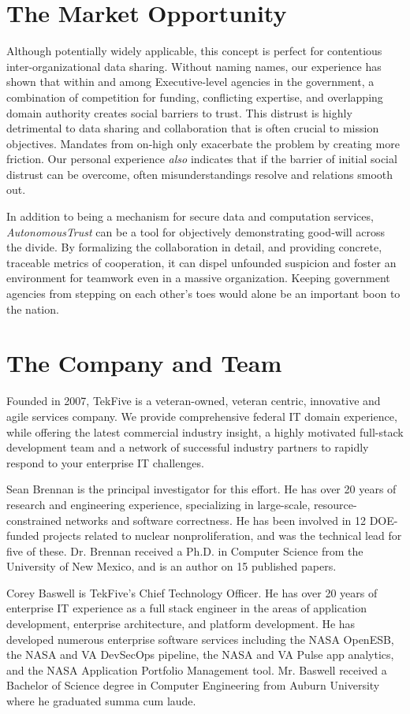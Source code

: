 \documentclass[10pt, twoside]{article}
\newcommand{\projectName}{\emph{AutonomousTrust }}
\begin{document}
\section{The Market Opportunity}

Although potentially widely applicable, this concept is perfect for contentious inter-organizational data sharing. Without naming names, our experience has shown that within and among Executive-level agencies in the government, a combination of competition for funding, conflicting expertise, and overlapping domain authority creates social barriers to trust. This distrust is highly detrimental to data sharing and collaboration that is often crucial to mission objectives. Mandates from on-high only exacerbate the problem by creating more friction. Our personal experience \emph{also} indicates that if the barrier of initial social distrust can be overcome, often misunderstandings resolve and relations smooth out.

In addition to being a mechanism for secure data and computation services, \projectName can be a tool for objectively demonstrating good-will across the divide. By formalizing the collaboration in detail, and providing concrete, traceable metrics of cooperation, it can dispel unfounded suspicion and foster an environment for teamwork even in a massive organization. Keeping government agencies from stepping on each other's toes would alone be an important boon to the nation.

\section{The Company and Team}

Founded in 2007, TekFive is a veteran-owned, veteran centric, innovative and agile services company. We provide comprehensive federal IT domain experience, while offering the latest commercial industry insight, a highly motivated full-stack development team and a network of successful industry partners to rapidly respond to your enterprise IT challenges.

Sean Brennan is the principal investigator for this effort. He has over 20 years of research and engineering experience, specializing in large-scale, resource-constrained networks and software correctness. He has been involved in 12 DOE-funded projects related to nuclear nonproliferation, and was the technical lead for five of these.
Dr. Brennan received a Ph.D. in Computer Science from the University of New Mexico, and is an author on 15 published papers.

Corey Baswell is TekFive's Chief Technology Officer. He has over 20 years of enterprise IT experience as a full stack engineer in the areas of application development, enterprise architecture, and platform development. He has developed numerous enterprise software services including the NASA OpenESB, the NASA and VA DevSecOps pipeline, the NASA and VA Pulse app analytics, and the NASA Application Portfolio Management tool.
Mr. Baswell received a Bachelor of Science degree in Computer Engineering from Auburn University where he graduated summa cum laude.
\end{document}
